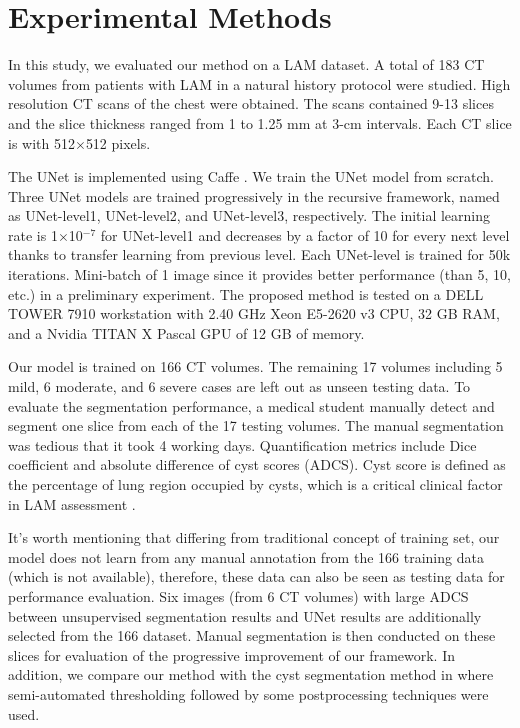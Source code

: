 \documentclass{article}
\begin{document}
\section{Experimental Methods}
In this study, we evaluated our method on a LAM dataset. A total of 183 CT volumes from patients with LAM in a natural history protocol were studied. High resolution CT scans of the chest were obtained. %
The scans contained 9-13 slices and the slice thickness ranged from 1 to 1.25 mm at 3-cm intervals. Each CT slice is with 512$\times$512 pixels.

The UNet is implemented using Caffe \cite{jia2013caffe}. We train the UNet model from scratch. Three UNet models are trained progressively in the recursive framework, named as UNet-level1, UNet-level2, and UNet-level3, respectively. The initial learning rate is 1$\times$10$^{-7}$ for UNet-level1 and decreases by a factor of 10 for every next level thanks to transfer learning from previous level. Each UNet-level is trained for 50k iterations. Mini-batch of 1 image since it provides better performance (than 5, 10, etc.) in a preliminary experiment. The proposed method is tested on a DELL TOWER 7910 workstation with 2.40 GHz Xeon E5-2620 v3 CPU, 32 GB RAM, and a Nvidia TITAN X Pascal GPU of 12 GB of memory.

Our model is trained on 166 CT volumes. The remaining 17 volumes including 5 mild, 6 moderate, and 6 severe cases are left out as unseen testing data. To evaluate the segmentation performance, a medical student manually detect and segment one slice from each of the 17 testing volumes. %
The manual segmentation was tedious that it took 4 working days. Quantification metrics include Dice coefficient and absolute difference of cyst scores (ADCS).
Cyst score is defined as the percentage of lung region occupied by cysts, which is a critical clinical factor in LAM assessment \cite{yao2014sustained}.

It's worth mentioning that differing from traditional concept of training set, our model does not learn from any manual annotation from the 166 training data (which is not available), therefore, these data can also be seen as testing data for performance evaluation. Six images (from 6 CT volumes) with large ADCS between unsupervised segmentation results and UNet results are additionally selected from the 166 dataset. Manual segmentation is then conducted on these slices for evaluation of the progressive improvement of our framework. In addition, we compare our method with the cyst segmentation method in \cite{yao2014sustained} where semi-automated thresholding followed by some postprocessing techniques were used.
\end{document}
